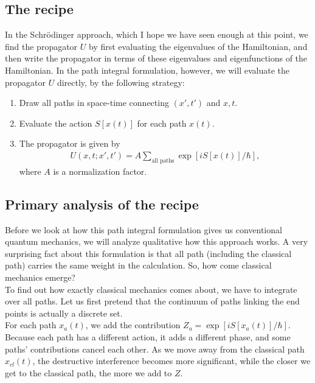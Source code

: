 \documentclass{book}
\theoremstyle{definition}
\newcommand{\lb}{\left[}
\newcommand{\rb}{\right]}
\begin{document}
\subsection{The recipe}


In the Schr\"{o}dinger approach, which I hope we have seen enough at this point, we find the propagator $U$ by first evaluating the eigenvalues of the Hamiltonian, and then write the propagator in terms of these eigenvalues and eigenfunctions of the Hamiltonian. In the path integral formulation, however, we will evaluate the propagator $U$ directly, by the following strategy:
\begin{enumerate}
	\item Draw all paths in space-time connecting $(x',t')$ and $x,t$.
	\item Evaluate the action $S[x(t)]$ for each path $x(t)$.
	\item The propagator is given by
	\begin{align}
	U(x,t;x',t') = A \sum_{\text{all paths}} \exp\lb iS[x(t)]/\hbar \rb,
	\end{align}
	where $A$ is a normalization factor. 
\end{enumerate}



\subsection{Primary analysis of the recipe}


Before we look at how this path integral formulation gives us conventional quantum mechanics, we will analyze qualitative how this approach works. A very surprising fact about this formulation is that all path (including the classical path) carries the same weight in the calculation. So, how come classical mechanics emerge?\\

To find out how exactly classical mechanics comes about, we have to integrate over all paths. Let us first pretend that the continuum of paths linking the end points is actually a discrete set. \\

For each path $x_a(t)$, we add the contribution $Z_a = \exp[iS[x_a(t)]/\hbar]$. Because each path has a different action, it adds a different phase, and some paths' contributions cancel each other. As we move away from the classical path $x_{cl}(t)$, the destructive interference becomes more significant, while the closer we get to the classical path, the more we add to $Z$. \\
\end{document}
